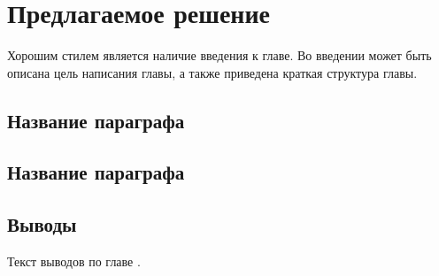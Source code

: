 \chapter{Предлагаемое решение} \label{ch3}


Хорошим стилем является наличие введения к главе. Во введении может быть описана цель написания главы, а также приведена краткая структура главы. 
	
\section{Название параграфа} \label{ch3:sec1}

\section{Название параграфа} \label{ch3:sec2}



\section{Выводы} \label{ch3:conclusion}

Текст выводов по главе \thechapter.


%
